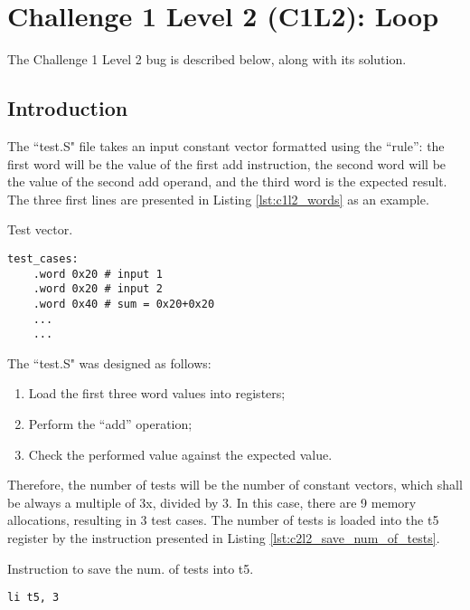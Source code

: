 \section{Challenge 1 Level 2 (C1L2): Loop}

The Challenge 1 Level 2 bug is described below, along with its solution.

\subsection{Introduction}

The ``test.S" file takes an input constant vector formatted using the ``rule'': the first word will be the value of the first add instruction, the second word will be the value of the second add operand, and the third word is the expected result. The three first lines are presented in Listing \ref{lst:c1l2_words} as an example.

\begin{listing}[h]
\caption{Test vector.}
\label{lst:c1l2_words}
\begin{verbatim}
test_cases:
    .word 0x20 # input 1
    .word 0x20 # input 2
    .word 0x40 # sum = 0x20+0x20
    ...
    ...
\end{verbatim}
\end{listing}

The ``test.S" was designed as follows:

\begin{enumerate}
\item Load the first three word values into registers;
\item Perform the ``add'' operation;
\item Check the performed value against the expected value.
\end{enumerate}

Therefore, the number of tests will be the number of constant vectors, which shall be always a multiple of 3x, divided by 3. In this case, there are 9 memory allocations, resulting in 3 test cases. The number of tests is loaded into the t5 register by the instruction presented in Listing \ref{lst:c2l2_save_num_of_tests}.

\begin{listing}[h]
\caption{Instruction to save the num. of tests into t5.}
\label{lst:c2l2_save_num_of_tests}
\begin{verbatim}
li t5, 3
\end{verbatim}
\end{listing}

